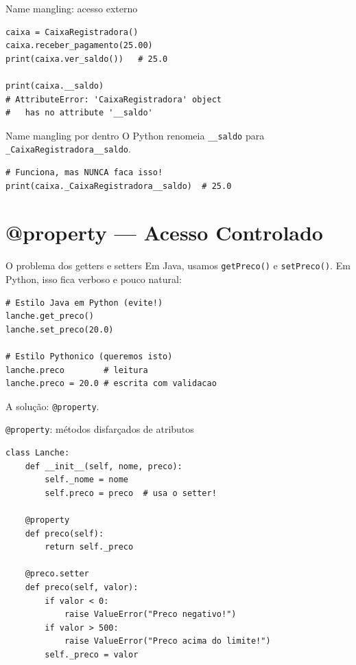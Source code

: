 \documentclass[aspectratio=169]{beamer}
\begin{document}
\begin{frame}[fragile]{Name mangling: acesso externo}
\begin{lstlisting}
caixa = CaixaRegistradora()
caixa.receber_pagamento(25.00)
print(caixa.ver_saldo())   # 25.0

print(caixa.__saldo)
# AttributeError: 'CaixaRegistradora' object
#   has no attribute '__saldo'
\end{lstlisting}

\begin{alertblock}{Name mangling por dentro}
O Python renomeia \texttt{\_\_saldo} para \texttt{\_CaixaRegistradora\_\_saldo}.
\end{alertblock}

\begin{lstlisting}
# Funciona, mas NUNCA faca isso!
print(caixa._CaixaRegistradora__saldo)  # 25.0
\end{lstlisting}
\end{frame}

\section{@property --- Acesso Controlado}

\begin{frame}[fragile]{O problema dos getters e setters}
Em Java, usamos \texttt{getPreco()} e \texttt{setPreco()}.
Em Python, isso fica verboso e pouco natural:

\begin{lstlisting}
# Estilo Java em Python (evite!)
lanche.get_preco()
lanche.set_preco(20.0)

# Estilo Pythonico (queremos isto)
lanche.preco        # leitura
lanche.preco = 20.0 # escrita com validacao
\end{lstlisting}

A solução: \texttt{@property}.
\end{frame}

\begin{frame}[fragile]{\texttt{@property}: métodos disfarçados de atributos}
\begin{lstlisting}
class Lanche:
    def __init__(self, nome, preco):
        self._nome = nome
        self.preco = preco  # usa o setter!

    @property
    def preco(self):
        return self._preco

    @preco.setter
    def preco(self, valor):
        if valor < 0:
            raise ValueError("Preco negativo!")
        if valor > 500:
            raise ValueError("Preco acima do limite!")
        self._preco = valor
\end{lstlisting}
\end{frame}
\end{document}
